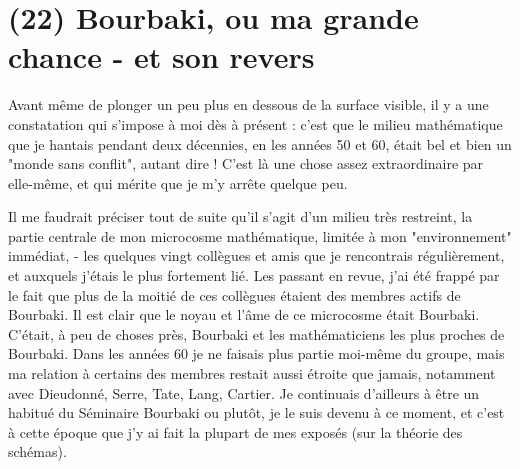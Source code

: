 \section{(22) Bourbaki, ou ma grande chance - et son revers}

Avant même de plonger un peu plus en dessous de la surface visible, il y a une constatation qui s'impose à moi dès à présent : c'est que le milieu mathématique que je hantais pendant deux décennies, en les années 50 et 60, était bel et bien un "monde sans conflit", autant dire ! C'est là une chose assez extraordinaire par elle-même, et qui mérite que je m'y arrête quelque peu.

Il me faudrait préciser tout de suite qu'il s'agit d'un milieu très restreint, la partie centrale de mon microcosme mathématique, limitée à mon "environnement" immédiat, - les quelques vingt collègues et amis que je rencontrais régulièrement, et auxquels j'étais le plus fortement lié. Les passant en revue, j'ai été frappé par le fait que plus de la moitié de ces collègues étaient des membres actifs de Bourbaki. Il est clair que le noyau et l'âme de ce microcosme était Bourbaki. C'était, à peu de choses près, Bourbaki et les mathématiciens les plus proches de Bourbaki. Dans les années 60 je ne faisais plus partie moi-même du groupe, mais ma relation à certains des membres restait aussi étroite que jamais, notamment avec Dieudonné, Serre, Tate, Lang, Cartier. Je continuais d'ailleurs à être un habitué du Séminaire Bourbaki ou plutôt, je le suis devenu à ce moment, et c'est à cette époque que j'y ai fait la plupart de mes exposés (sur la théorie des schémas).

